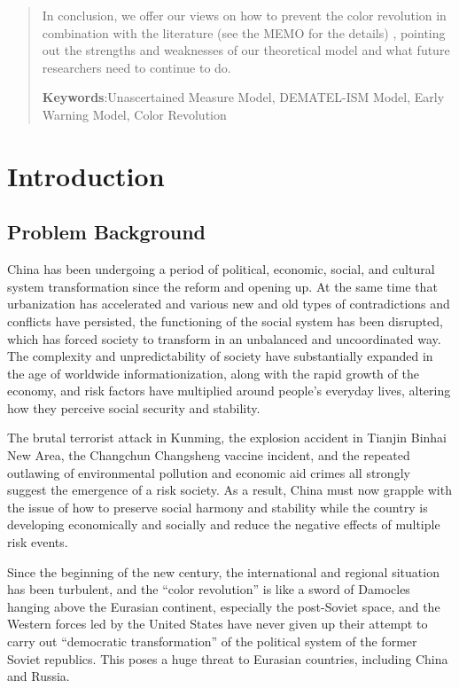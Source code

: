 \documentclass[12pt]{article}  %
\begin{document}
\begin{abstract}
In conclusion, we offer our views on how to prevent the color revolution in combination with the literature (see the MEMO for the details) , pointing out the strengths and weaknesses of our theoretical model and what future researchers need to continue to do.
    
    \vspace{5pt}
    \textbf{Keywords}:Unascertained Measure Model, DEMATEL-ISM Model, Early Warning Model, Color Revolution

\end{abstract}

\maketitle  %
\tableofcontents  %


\section{Introduction}
\subsection{Problem Background}
China has been undergoing a period of political, economic, social, and cultural system transformation since the reform and opening up. At the same time that urbanization has accelerated and various new and old types of contradictions and conflicts have persisted, the functioning of the social system has been disrupted, which has forced society to transform in an unbalanced and uncoordinated way. The complexity and unpredictability of society have substantially expanded in the age of worldwide informationization, along with the rapid growth of the economy, and risk factors have multiplied around people's everyday lives, altering how they perceive social security and stability. 

The brutal terrorist attack in Kunming, the explosion accident in Tianjin Binhai New Area, the Changchun Changsheng vaccine incident, and the repeated outlawing of environmental pollution and economic aid crimes all strongly suggest the emergence of a risk society. As a result, China must now grapple with the issue of how to preserve social harmony and stability while the country is developing economically and socially and reduce the negative effects of multiple risk events.

Since the beginning of the new century, the international and regional situation has been turbulent, and the ``color revolution'' is like a sword of Damocles hanging above the Eurasian continent, especially the post-Soviet space, and the Western forces led by the United States have never given up their attempt to carry out ``democratic transformation'' of the political system of the former Soviet republics. This poses a huge threat to Eurasian countries, including China and Russia.
\end{document}
